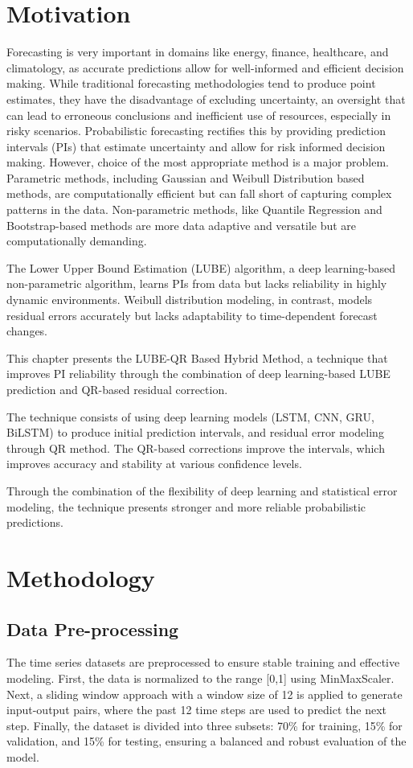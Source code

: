 \section{ Motivation}
Forecasting is very important in domains like energy, finance, healthcare, and climatology, as accurate predictions allow for well-informed and efficient decision making. While traditional forecasting methodologies tend to produce point estimates, they have the disadvantage of excluding uncertainty, an oversight that can lead to erroneous conclusions and inefficient use of resources, especially in risky scenarios. Probabilistic forecasting rectifies this by providing prediction intervals (PIs) that estimate uncertainty and allow for risk informed decision making. However, choice of the most appropriate method is a major problem. Parametric methods, including Gaussian and Weibull Distribution based methods, are computationally efficient but can fall short of capturing complex patterns in the data. Non-parametric methods, like Quantile Regression and Bootstrap-based methods are more data adaptive and versatile but are computationally demanding.

The Lower Upper Bound Estimation (LUBE) algorithm, a deep learning-based non-parametric algorithm, learns PIs from data but lacks reliability in highly dynamic environments. 
Weibull distribution modeling, in contrast, models residual errors accurately but lacks adaptability to time-dependent forecast changes.

This chapter presents the LUBE-QR Based Hybrid Method, a technique that improves PI reliability through the combination of deep learning-based LUBE prediction and QR-based residual correction. 

The technique consists of using deep learning models (LSTM, CNN, GRU, BiLSTM) to produce initial prediction intervals, and residual error modeling through QR method.
The QR-based corrections improve the intervals, which improves accuracy and stability at various confidence levels. 

Through the combination of the flexibility of deep learning and statistical error modeling, the technique presents stronger and more reliable probabilistic predictions. 


\section{Methodology}
\subsection{Data Pre-processing}
The time series datasets are preprocessed to ensure stable training and effective modeling. First, the data is normalized to the range [0,1] using MinMaxScaler. Next, a sliding window approach with a window size of 12 is applied to generate input-output pairs, where the past 12 time steps are used to predict the next step. Finally, the dataset is divided into three subsets: 70\% for training, 15\% for validation, and 15\% for testing, ensuring a balanced and robust evaluation of the model.

